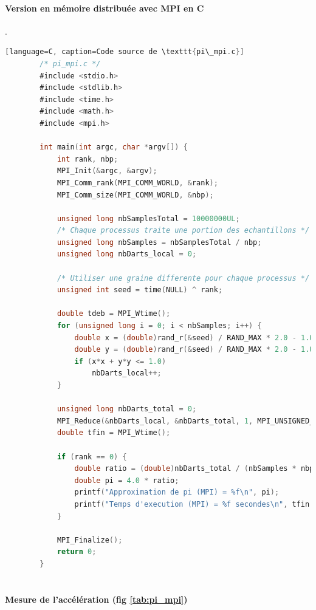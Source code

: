 \documentclass[a4paper,13pt]{book}
\begin{document}
    \paragraph{Version en mémoire distribuée avec MPI en C}.\\
    \begin{lstlisting}[language=C][language=C, caption=Code source de \texttt{pi\_mpi.c}]
        /* pi_mpi.c */
        #include <stdio.h>
        #include <stdlib.h>
        #include <time.h>
        #include <math.h>
        #include <mpi.h>
        
        int main(int argc, char *argv[]) {
            int rank, nbp;
            MPI_Init(&argc, &argv);
            MPI_Comm_rank(MPI_COMM_WORLD, &rank);
            MPI_Comm_size(MPI_COMM_WORLD, &nbp);
        
            unsigned long nbSamplesTotal = 10000000UL;
            /* Chaque processus traite une portion des echantillons */
            unsigned long nbSamples = nbSamplesTotal / nbp;
            unsigned long nbDarts_local = 0;
        
            /* Utiliser une graine differente pour chaque processus */
            unsigned int seed = time(NULL) ^ rank;
        
            double tdeb = MPI_Wtime();
            for (unsigned long i = 0; i < nbSamples; i++) {
                double x = (double)rand_r(&seed) / RAND_MAX * 2.0 - 1.0;
                double y = (double)rand_r(&seed) / RAND_MAX * 2.0 - 1.0;
                if (x*x + y*y <= 1.0)
                    nbDarts_local++;
            }
        
            unsigned long nbDarts_total = 0;
            MPI_Reduce(&nbDarts_local, &nbDarts_total, 1, MPI_UNSIGNED_LONG, MPI_SUM, 0, MPI_COMM_WORLD);
            double tfin = MPI_Wtime();
        
            if (rank == 0) {
                double ratio = (double)nbDarts_total / (nbSamples * nbp);
                double pi = 4.0 * ratio;
                printf("Approximation de pi (MPI) = %f\n", pi);
                printf("Temps d'execution (MPI) = %f secondes\n", tfin - tdeb);
            }
        
            MPI_Finalize();
            return 0;
        }        
        
\end{lstlisting}

\paragraph{Mesure de l'accélération (fig \ref{tab:pi_mpi})}
\end{document}
